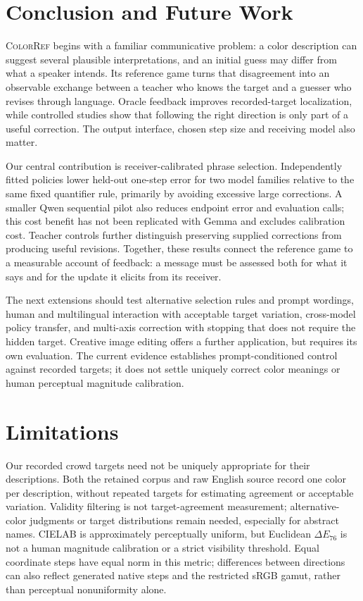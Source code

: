\documentclass[11pt]{article}
\begin{document}
\section{Conclusion and Future Work}
\label{sec:conclusion}
\textsc{ColorRef} begins with a familiar communicative problem: a color
description can suggest several plausible interpretations, and an initial
guess may differ from what a speaker intends. Its reference game turns
that disagreement into an observable exchange between a teacher who
knows the target and a guesser who revises through language. Oracle
feedback improves recorded-target localization, while controlled studies
show that following the right direction is only part of a useful correction.
The output interface, chosen step size and receiving model also matter.

Our central contribution is receiver-calibrated phrase selection.
Independently fitted policies lower held-out one-step error for two
model families relative to the same fixed quantifier rule, primarily by
avoiding excessive large corrections. A smaller Qwen sequential pilot
also reduces endpoint error and evaluation calls; this cost benefit has
not been replicated with Gemma and excludes calibration cost. Teacher
controls further distinguish preserving supplied corrections from
producing useful revisions. Together, these results connect the reference
game to a measurable account of feedback: a message must be assessed both
for what it says and for the update it elicits from its receiver.

The next extensions should test alternative selection rules and prompt
wordings, human and multilingual interaction with acceptable target
variation, cross-model policy transfer, and multi-axis correction with
stopping that does not require the hidden target. Creative image editing
offers a further application, but requires its own evaluation. The current
evidence establishes prompt-conditioned control against recorded targets;
it does not settle uniquely correct color meanings or human perceptual
magnitude calibration.

\section{Limitations}
\label{sec:limitations}
Our recorded crowd targets need not be uniquely appropriate for their
descriptions. Both the retained corpus and raw English source record one
color per description, without repeated targets for estimating agreement
or acceptable variation. Validity filtering is not target-agreement measurement;
alternative-color judgments or target distributions remain needed,
especially for abstract names. CIELAB is approximately perceptually uniform,
but Euclidean $\Delta E_{76}$ is not a human magnitude calibration or a
strict visibility threshold. Equal coordinate steps have equal norm in
this metric; differences between directions can also reflect generated
native steps and the restricted sRGB gamut, rather than perceptual
nonuniformity alone.
\end{document}
